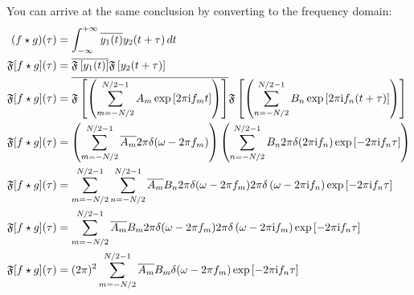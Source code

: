 \documentclass[12pt]{article}
\newenvironment{derivation}[1][Derivation]{\begin{trivlist}
\item[\hskip \labelsep {\bfseries #1:}]}{\end{trivlist}}
\begin{document}
\begin{derivation}
\newpage
You can arrive at the same conclusion by converting to the frequency domain:
\begin{align}
(f \star g)(\tau) & = \int_{-\infty}^{+\infty} \overline{y_1(t)} y_2(t+\tau) \,dt \\
\mathfrak{F}[f \star g](\tau) & =  \overline{\mathfrak{F}\left[y_1(t)\right]} \mathfrak{F}\left[y_2(t+\tau)\right] \\
\mathfrak{F}[f \star g](\tau) & =  \overline{\mathfrak{F}\left[\left( \sum_{m = -N/2}^{N/2-1} A_m \exp{[2 \pi\mathrm{i}f_m t]} \right)\right]} \mathfrak{F}\left[\left( \sum_{n = -N/2}^{N/2-1} B_n \exp{[2 \pi\mathrm{i}f_n (t+\tau)]} \right)\right] \\
\mathfrak{F}[f \star g](\tau) & =  \left( \sum_{m = -N/2}^{N/2-1} \overline{A_m} 2 \pi \delta (\omega - 2 \pi f_m) \right) \left( \sum_{n = -N/2}^{N/2-1} B_n 2 \pi  \delta(2 \pi \mathrm{i} f_n) \exp{[-2 \pi\mathrm{i}f_n \tau]} \right) \\
\mathfrak{F}[f \star g](\tau) & =  \sum_{m = -N/2}^{N/2-1} \sum_{n = -N/2}^{N/2-1} \overline{A_m} B_n 2 \pi  \delta (\omega - 2 \pi f_m) 2 \pi  \delta \left(\omega - 2 \pi \mathrm{i} f_n \right) \exp{[-2 \pi\mathrm{i}f_n \tau]} \\
\mathfrak{F}[f \star g](\tau) & =  \sum_{m = -N/2}^{N/2-1} \overline{A_m} B_m 2 \pi \delta (\omega - 2 \pi f_m)  2 \pi \delta \left(\omega - 2 \pi \mathrm{i} f_m \right) \exp{[-2 \pi\mathrm{i}f_n \tau]} \\
\mathfrak{F}[f \star g](\tau) & = (2 \pi )^2 \sum_{m = -N/2}^{N/2-1} \overline{A_m} B_m \delta (\omega - 2 \pi f_m)  \exp{[-2 \pi\mathrm{i}f_n \tau]}
\end{align}


\end{derivation}

\end{document}
